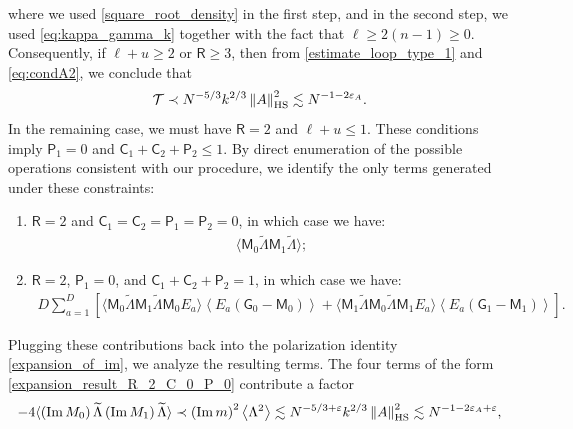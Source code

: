 \documentclass[10pt,reqno]{amsart}
\numberwithin{equation}{section}
\numberwithin{figure}{section}
\theoremstyle{plain} %
\theoremstyle{definition} %
\newcommand{\wt}{\widetilde}
\renewcommand{\txt}[1]{\text{\rm{#1}}}
\newcommand{\cT}{\mathcal T}
\newcommand{\sG}{\mathsf G}
\newcommand{\sM}{\mathsf M}
\newcommand{\sR}{\mathsf R}
\newcommand{\sC}{\mathsf C}
\newcommand{\sP}{\mathsf P}
\renewcommand{\leq}{\le}
\renewcommand{\geq}{\ge}
\newcommand{\pa}[1]{\left({#1}\right)}
\newcommand{\qa}[1]{\left[{#1}\right]}
\newcommand{\norma}[1]{\left\lVert #1 \right\rVert}
\newcommand{\avg}[1]{\langle #1 \rangle}
\newcommand{\avga}[1]{\left\langle #1 \right\rangle}
\DeclareMathOperator{\im}{\mathrm{Im}}
\newcommand{\tLambda}{{\wt{\Lambda}}}
\newcommand{\be}{\begin{equation}}
\newcommand{\ee}{\end{equation}}
\newcommand{\HS}{\txt{HS}}
\newcommand{\dsum}[1]{\sum_{#1=1}^D}
\newcommand{\tl}{\tLambda}
\newcommand{\mm}{\ell}
\numberwithin{equation}{section}
\begin{document}
      where we used \eqref{square_root_density} in the first step, and in the second step, we used \eqref{eq:kappa_gamma_k} together with the fact that $\mm\geq 2\pa{n-1}\geq 0$. Consequently, if $\mm+u\geq 2$ or $\sR\geq 3$, then from \eqref{estimate_loop_type_1} and \eqref{eq:condA2}, we conclude that
      \be\label{eq:easydirect}\cT\prec N^{-5/3}k^{2/3}\norma{A}_{\HS}^2\lesssim N^{-1-2\varepsilon_A} .\ee 
      In the remaining case, we must have $\sR=2$ and $\mm+u\leq 1$. These conditions imply $\sP_1=0$ and $\sC_1+\sC_2+\sP_2\leq 1$. By direct enumeration of the possible operations consistent with our procedure, we identify the only terms generated under these constraints:
      \begin{enumerate}
          \item $\sR=2$ and $\sC_1=\sC_2=\sP_1=\sP_2=0$, in which case we have:
          \begin{equation}\label{expansion_result_R_2_C_0_P_0}
              \begin{aligned}
                  \avg{\sM_0\tLambda\sM_1\tLambda};
              \end{aligned}
          \end{equation}
          \item $\sR=2$, $\sP_1=0$, and $\sC_1+\sC_2+\sP_2=1$, in which case we have:
          \begin{equation}\label{expansion_result_R_2_C_1_P_0}
              \begin{aligned}
                  D\dsum{a}\qa{\avg{\sM_0\tLambda\sM_1\tLambda\sM_0E_a}\avga{E_a\pa{\sG_0-\sM_0}}+\avg{\sM_1\tLambda\sM_0\tLambda\sM_1 E_a}\avga{E_a\pa{\sG_1-\sM_1}}}.
              \end{aligned}
          \end{equation}
      \end{enumerate}
      Plugging these contributions back into the polarization identity \eqref{expansion_of_im}, we analyze the resulting terms. The four terms of the form \eqref{expansion_result_R_2_C_0_P_0} contribute a factor 
      \begin{equation}\label{eq:polar_cancel}
          \begin{aligned}
              -4\avg{\pa{\im M_0}\tl\pa{\im M_1}\tl}\prec {\pa{\im m}^2 \avga{\Lambda^2}}\lesssim {N^{-5/3+\varepsilon}k^{2/3}\norma{A}_{\HS}^2}\lesssim N^{-1-2\varepsilon_A+\varepsilon},
          \end{aligned}
      \end{equation}
\end{document}
